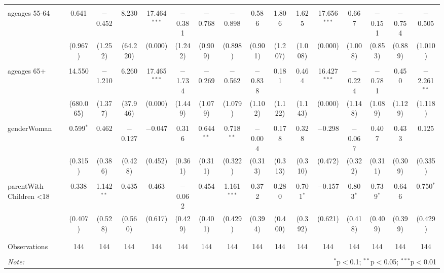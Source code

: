 \begin{table}[!htbp]
\begin{tabular}{@{\extracolsep{5pt}}lccccccccccccccc}
  & & & & & & & & & & & & & & & \\ 
 ageages 55-64 & 0.641 & $-$0.452 & 8.230 & 17.464$^{***}$ & $-$0.381 & $-$0.768 & $-$0.898 & 0.586 & 1.806 & 1.625 & 17.656$^{***}$ & 0.667 & $-$0.151 & $-$0.754 & $-$0.505 \\ 
  & (0.967) & (1.252) & (64.220) & (0.000) & (1.242) & (0.909) & (0.898) & (0.901) & (1.207) & (1.008) & (0.000) & (1.008) & (0.853) & (0.889) & (1.010) \\ 
  & & & & & & & & & & & & & & & \\ 
 ageages 65+ & 14.550 & $-$1.210 & 6.260 & 17.465$^{***}$ & $-$1.734 & $-$0.269 & $-$0.562 & $-$0.838 & 0.181 & 0.464 & 16.427$^{***}$ & $-$0.224 & $-$0.781 & 0.450 & $-$2.261$^{**}$ \\ 
  & (680.065) & (1.377) & (37.946) & (0.000) & (1.449) & (1.079) & (1.079) & (1.102) & (1.122) & (1.143) & (0.000) & (1.148) & (1.089) & (1.129) & (1.118) \\ 
  & & & & & & & & & & & & & & & \\ 
 genderWoman & 0.599$^{*}$ & 0.462 & $-$0.127 & $-$0.047 & 0.316 & 0.644$^{**}$ & 0.718$^{**}$ & $-$0.004 & 0.178 & 0.328 & $-$0.298 & $-$0.067 & 0.407 & 0.433 & 0.125 \\ 
  & (0.315) & (0.386) & (0.428) & (0.452) & (0.361) & (0.311) & (0.322) & (0.313) & (0.313) & (0.310) & (0.472) & (0.322) & (0.311) & (0.309) & (0.335) \\ 
  & & & & & & & & & & & & & & & \\ 
 parentWith Children \textless  18 & 0.338 & 1.142$^{**}$ & 0.435 & 0.463 & $-$0.062 & 0.454 & 1.161$^{***}$ & 0.372 & 0.280 & 0.701$^{*}$ & $-$0.157 & 0.803$^{*}$ & 0.739$^{*}$ & 0.646 & 0.750$^{*}$ \\ 
  & (0.407) & (0.528) & (0.560) & (0.617) & (0.429) & (0.401) & (0.429) & (0.394) & (0.400) & (0.392) & (0.621) & (0.418) & (0.409) & (0.399) & (0.429) \\ 
  & & & & & & & & & & & & & & & \\ 
\hline \\[-1.8ex] 
Observations & 144 & 144 & 144 & 144 & 144 & 144 & 144 & 144 & 144 & 144 & 144 & 144 & 144 & 144 & 144 \\ 
\hline 
\hline \\[-1.8ex] 
\textit{Note:}  & \multicolumn{15}{r}{$^{*}$p$<$0.1; $^{**}$p$<$0.05; $^{***}$p$<$0.01} \\ 
\end{tabular} 
\end{table} 
